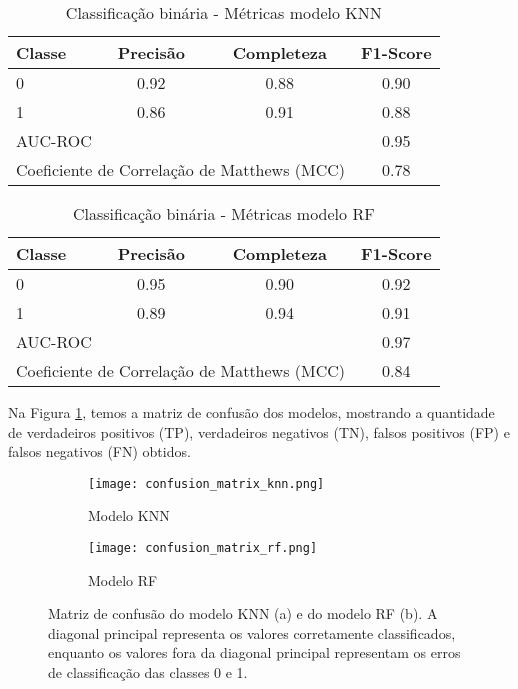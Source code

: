 \begin{table}[!ht]
    \centering
    \caption{Classificação binária - Métricas modelo KNN}
    \begin{tabular}{lccc}
        \toprule
        Classe & Precisão & Completeza & F1-Score \\
        \midrule
        0 & 0.92 & 0.88 & 0.90 \\
        1 & 0.86 & 0.91 & 0.88 \\
        \midrule
        \multicolumn{3}{l}{AUC-ROC} & 0.95 \\
        \multicolumn{3}{l}{Coeficiente de Correlação de Matthews (MCC)} & 0.78 \\
        \bottomrule
    \end{tabular}
    \label{metricas_modelo_knn}
\end{table}


\begin{table}[!ht]
    \centering
    \caption{Classificação binária - Métricas modelo RF}
    \begin{tabular}{lccc}
        \toprule
        Classe & Precisão & Completeza & F1-Score \\
        \midrule
        0 & 0.95 & 0.90 & 0.92 \\
        1 & 0.89 & 0.94 & 0.91 \\
        \midrule
        \multicolumn{3}{l}{AUC-ROC} & 0.97 \\
        \multicolumn{3}{l}{Coeficiente de Correlação de Matthews (MCC)} & 0.84 \\
        \bottomrule
    \end{tabular}
    \label{metricas_modelo_rf}
\end{table}

Na Figura \ref{confusion_matrix}, temos a matriz de confusão dos modelos, mostrando a quantidade de verdadeiros positivos (TP), verdadeiros negativos (TN), falsos positivos (FP) e falsos negativos (FN) obtidos.

\begin{figure}[!ht]
    \centering
    \captionsetup{justification=centering}
    \begin{subfigure}[b]{0.45\textwidth}
        \texttt{[image: confusion\_matrix\_knn.png]}
        \caption{Modelo KNN}
    \end{subfigure}
    \begin{subfigure}[b]{0.45\textwidth}
        \texttt{[image: confusion\_matrix\_rf.png]}
        \caption{Modelo RF}
    \end{subfigure}
    \caption{Matriz de confusão do modelo KNN (a) e do modelo RF (b). A diagonal principal representa os valores corretamente classificados, enquanto os valores fora da diagonal principal representam os erros de classificação das classes 0 e 1.}
    \label{confusion_matrix}
\end{figure}

